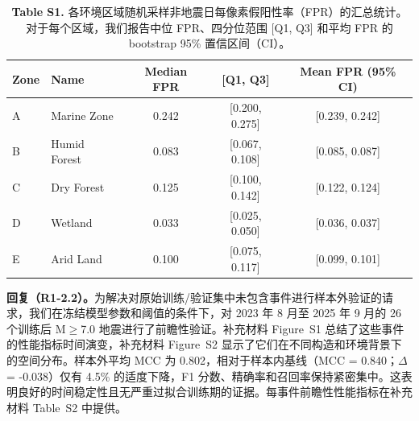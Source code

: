 \documentclass[12pt]{article}
\newcommand{\revresponse}[1]{\begingroup\color{responsecolor}#1\endgroup}
\begin{document}
{\begin{table}[H]
\small
\centering
\caption*{\textbf{Table S1.} 各环境区域随机采样非地震日每像素假阳性率（FPR）的汇总统计。对于每个区域，我们报告中位 FPR、四分位范围 [Q1, Q3] 和平均 FPR 的 bootstrap 95\% 置信区间（CI）。}
\begin{tabular}{@{}llccc@{}}
\toprule
Zone & Name          & Median FPR & [Q1, Q3]        & Mean FPR (95\% CI)        \\
\midrule
A    & Marine Zone   & 0.242      & [0.200, 0.275]  & [0.239, 0.242] \\
B    & Humid Forest  & 0.083      & [0.067, 0.108]  & [0.085, 0.087] \\
C    & Dry Forest    & 0.125      & [0.100, 0.142]  & [0.122, 0.124] \\
D    & Wetland       & 0.033      & [0.025, 0.050]  & [0.036, 0.037] \\
E    & Arid Land     & 0.100      & [0.075, 0.117]  & [0.099, 0.101] \\
\bottomrule
\end{tabular}
\end{table}
}

\revresponse{%
\textbf{回复（R1-2.2）。}为解决对原始训练/验证集中未包含事件进行样本外验证的请求，我们在冻结模型参数和阈值的条件下，对 2023 年 8 月至 2025 年 9 月的 26 个训练后 M$\ge$7.0 地震进行了前瞻性验证。补充材料 Figure~S1 总结了这些事件的性能指标时间演变，补充材料 Figure~S2 显示了它们在不同构造和环境背景下的空间分布。样本外平均 MCC 为 0.802，相对于样本内基线（MCC = 0.840；$\Delta$ = -0.038）仅有 4.5\% 的适度下降，F1 分数、精确率和召回率保持紧密集中。这表明良好的时间稳定性且无严重过拟合训练期的证据。每事件前瞻性性能指标在补充材料 Table~S2 中提供。
}
\end{document}
